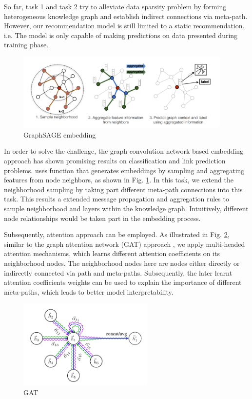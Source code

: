 So far, task 1 and task 2 try to alleviate data sparsity problem by forming heterogeneous knowledge graph and establish indirect connections via meta-path. However, our recommendation model is still limited to a static recommendation. i.e. The model is only capable of making predictions on data presented during training phase.

\begin{figure}[!ht]
    \centering
    \includegraphics[width=0.95\textwidth]{figs/sagegraph.png}
    \caption{GraphSAGE embedding \citep{hamilton2017inductive}}\label{fig:sagegraph}
\end{figure}

In order to solve the challenge, the graph convolution network based embedding approach has shown promising results on classification and link prediction problems. \citet{hamilton2017inductive} uses function that generates embeddings by sampling and aggregating features from node neighbors, as shown in Fig. \ref{fig:sagegraph}. In this task, we extend the neighborhood sampling by taking part different meta-path connections into this task. This results a extended message propagation and aggregation rules to sample neighborhood and layers within the knowledge graph. Intuitively, different node relationships would be taken part in the embedding process.

Subsequently, attention approach can be employed. As illustrated in Fig. \ref{fig:gat}, similar to the graph attention network (GAT) approach \citep{velivckovic2017graph}, we apply multi-headed attention mechanisms, which learns different attention coefficients on its neighborhood nodes. The neighborhood nodes here are nodes either directly or indirectly connected via path and meta-paths. Subsequently, the later learnt attention coefficients weights can be used to explain the importance of different meta-paths, which leads to better model interpretability.

\begin{figure}[!ht]
    \centering
    \includegraphics[width=0.6\textwidth]{figs/gat.png}
    \caption{GAT \citep{velivckovic2017graph}}\label{fig:gat}
\end{figure}

